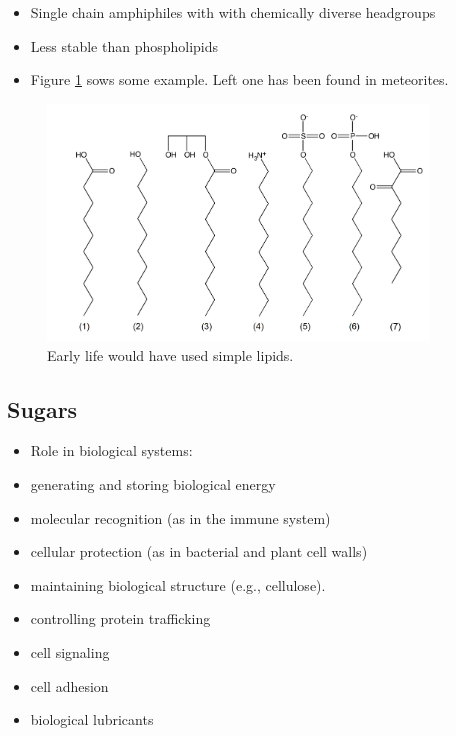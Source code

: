 \documentclass[]{article}
\begin{document}
\begin{itemize}
	\item Single chain amphiphiles with with chemically
	diverse headgroups
	\item Less stable than phospholipids
	\item Figure \ref{fig:SimplerLipids} sows some example. Left one has been found in meteorites.
\end{itemize}
\begin{figure}[H]
	\caption{Early life would have used simple lipids.}\label{fig:SimplerLipids} 
	\includegraphics[width=0.9\textwidth]{SimplerLipids}
\end{figure}

\subsection{Sugars}
\begin{itemize}
	\item Role in biological systems:
	\item generating and storing biological energy
	\item molecular recognition (as in the immune system)
	\item cellular protection (as in bacterial and plant cell 	walls)
	\item maintaining biological structure (e.g., cellulose).
	\item controlling protein trafficking
	\item cell signaling
	\item cell adhesion
	\item biological lubricants
\end{itemize}
\end{document}
